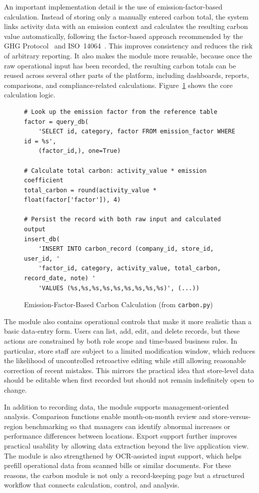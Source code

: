 \documentclass[11pt,a4paper]{article}
\begin{document}
An important implementation detail is the use of emission-factor-based calculation. Instead of storing only a manually entered carbon total, the system links activity data with an emission context and calculates the resulting carbon value automatically, following the factor-based approach recommended by the GHG Protocol~\cite{ghgprotocol} and ISO~14064~\cite{iso14064}. This improves consistency and reduces the risk of arbitrary reporting. It also makes the module more reusable, because once the raw operational input has been recorded, the resulting carbon totals can be reused across several other parts of the platform, including dashboards, reports, comparisons, and compliance-related calculations. Figure~\ref{fig:carbon-calc} shows the core calculation logic.

\begin{figure}[h]
\begin{lstlisting}[style=pysnippet]
# Look up the emission factor from the reference table
factor = query_db(
    'SELECT id, category, factor FROM emission_factor WHERE id = %s',
    (factor_id,), one=True)

# Calculate total carbon: activity_value * emission coefficient
total_carbon = round(activity_value * float(factor['factor']), 4)

# Persist the record with both raw input and calculated output
insert_db(
    'INSERT INTO carbon_record (company_id, store_id, user_id, '
    'factor_id, category, activity_value, total_carbon, record_date, note) '
    'VALUES (%s,%s,%s,%s,%s,%s,%s,%s,%s)', (...))
\end{lstlisting}
\caption{Emission-Factor-Based Carbon Calculation (from \texttt{carbon.py})}
\label{fig:carbon-calc}
\end{figure}

The module also contains operational controls that make it more realistic than a basic data-entry form. Users can list, add, edit, and delete records, but these actions are constrained by both role scope and time-based business rules. In particular, store staff are subject to a limited modification window, which reduces the likelihood of uncontrolled retroactive editing while still allowing reasonable correction of recent mistakes. This mirrors the practical idea that store-level data should be editable when first recorded but should not remain indefinitely open to change.

In addition to recording data, the module supports management-oriented analysis. Comparison functions enable month-on-month review and store-versus-region benchmarking so that managers can identify abnormal increases or performance differences between locations. Export support further improves practical usability by allowing data extraction beyond the live application view. The module is also strengthened by OCR-assisted input support, which helps prefill operational data from scanned bills or similar documents. For these reasons, the carbon module is not only a record-keeping page but a structured workflow that connects calculation, control, and analysis.
\end{document}

